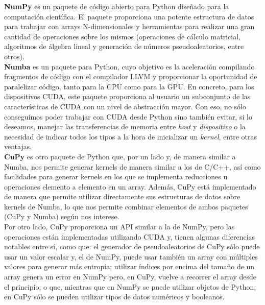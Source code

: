 \textbf{NumPy} \cite{numpy} es un paquete de código abierto para Python diseñado para la computación científica. El paquete proporciona una potente estructura de datos para trabajar con arrays N-dimensionales y herramientas para realizar una gran cantidad de operaciones sobre los mismos (operaciones de cálculo matricial, algoritmos de álgebra lineal y generación de números pseudoaleatorios, entre otros).\\

\textbf{Numba} \cite{numba} es un paquete para Python, cuyo objetivo es la aceleración compilando fragmentos de código con el compilador LLVM y proporcionar la oportunidad de paralelizar código, tanto para la CPU como para la GPU. En concreto, para los dispositivos CUDA, este paquete proporciona al usuario un subconjunto de las características de CUDA con un nivel de abstracción mayor. Con eso, no sólo conseguimos poder trabajar con CUDA desde Python sino también evitar, si lo deseamos, manejar las transferencias de memoria entre \textit{host} y \textit{dispositivo} o la necesidad de indicar todos los tipos a la hora de inicializar un \textit{kernel}, entre otras ventajas.\\

\textbf{CuPy} \cite{cupy} es otro paquete de Python que, por un lado y, de manera similar a Numba, nos permite generar kernels de manera similar a los de C/C++, así como facilidades para generar kernels en los que se implementa reducciones u operaciones elemento a elemento en un array. Además, CuPy está implementado de manera que permite utilizar directamente sus estructuras de datos sobre kernels de Numba, lo que nos permite combinar elementos de ambos paquetes (CuPy y Numba) según nos interese. \\

Por otro lado, CuPy proporciona un API similar a la de NumPy, pero las operaciones están implementadas utilizando CUDA y, tienen algunas diferencias notables entre sí, como que: el generador de pseudoaleatorios de CuPy sólo puede usar un valor escalar y, el de NumPy, puede usar también un array con múltiples valores para generar más entropía; utilizar índices por encima del tamaño de un array genera un error en NumPy pero, en CuPy, vuelve a recorrer el array desde el principio; o que, mientras que en NumPy se puede utilizar objetos de Python, en CuPy sólo se pueden utilizar tipos de datos numéricos y booleanos.\\

